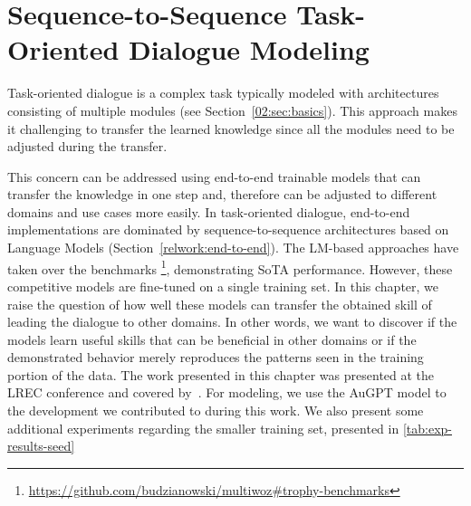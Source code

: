 \chapter{Sequence-to-Sequence Task-Oriented Dialogue Modeling}
\label{06:chap:lm-tod}
Task-oriented dialogue is a complex task typically modeled with architectures consisting of multiple modules (see Section~\ref{02:sec:basics}).
This approach makes it challenging to transfer the learned knowledge since all the modules need to be adjusted during the transfer.

This concern can be addressed using end-to-end trainable models that can transfer the knowledge in one step and, therefore can be adjusted to different domains and use cases more easily.
In task-oriented dialogue, end-to-end implementations are dominated by sequence-to-sequence architectures based on Language Models (Section~\ref{relwork:end-to-end}).
The LM-based approaches have taken over the benchmarks \footnote{\url{https://github.com/budzianowski/multiwoz\#trophy-benchmarks}}, demonstrating SoTA performance.
However, these competitive models are fine-tuned on a single training set.
In this chapter, we raise the question of how well these models can transfer the obtained skill of leading the dialogue to other domains.
In other words, we want to discover if the models learn useful skills that can be beneficial in other domains or if the demonstrated behavior merely reproduces the patterns seen in the training portion of the data.
The work presented in this chapter was presented at the LREC conference and covered by~\citet{hudecek-etal-2022-unifying}.
For modeling, we use the AuGPT model \cite{kulhanek-etal-2021-augpt} to the development we contributed to during this work.
We also present some additional experiments regarding the smaller training set, presented in \ref{tab:exp-results-seed}

